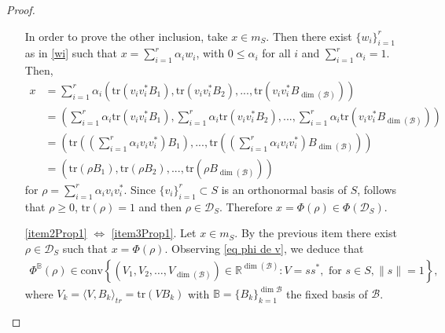 \documentclass[12pt,a4paper]{article}
\def\calB{\mathcal B}
\def\calD{\mathcal D}
\def\R{\mathbb R}
\def\tr{\text{tr}}
\numberwithin{equation}{section}
\begin{document}
\begin{proof}
\begin{enumerate}
	In order to prove the other inclusion, take $x\in m_S$. Then there exist  $\{w_i\}_{i=1}^{r}$ as in \eqref{wi} such that
	 $x=\sum_{i=1}^{r}\alpha_iw_i$, with $0\leq \alpha_i$ for all $i$ and $\sum_{i=1}^{r}\alpha_i=1$. Then, 
	 \begin{align*}
	 	x&= \sum_{i=1}^{r}\alpha_i\left( \tr(v_i v_i^* B_1),\tr(v_i v_i^* B_2),...,\tr(v_i v_i^* B_{\dim(\mathcal{B})})\right) \\
	 	&=  \left( \sum_{i=1}^{r}\alpha_i\tr(v_i v_i^* B_1),\sum_{i=1}^{r}\alpha_i\tr(v_i v_i^* B_2),...,\sum_{i=1}^{r}\alpha_i\tr(v_i v_i^* B_{\dim(\mathcal{B})})\right) \\
	 	&= \left(\tr\left( \left( \sum_{i=1}^{r}\alpha_iv_i v_i^*\right)  B_1\right) 
	 	,...,\tr\left( \left( \sum_{i=1}^{r}\alpha_iv_i v_i^*\right)  B_{\dim(\mathcal{B})}\right) \right) \\
	 	&= \left(\tr\left( \rho B_1\right) ,\tr\left(\rho  B_2\right) ,...,\tr\left( \rho B_{\dim(\mathcal{B})}\right) \right)
	 \end{align*}
	 for $\rho=\sum_{i=1}^{r}\alpha_iv_i v_i^*$.	 
	 Since $\{v_i\}_{i=1}^r\subset S$ is an orthonormal basis of $S$, follows that $\rho\geq 0$, 
	 $\tr(\rho)=1$ and then $\rho \in \mathcal{D}_S$. Therefore $x= \Phi(\rho)\in \Phi(\mathcal{D}_S)$.	 
	 
	\item[\ref{item2Prop1} $\Leftrightarrow$ \ref{item3Prop1}.] Let $x\in m_S$. By the previous item there exist  $\rho\in\calD_{S}$ such that $x=\Phi(\rho)$. Observing \eqref{eq phi de v}, we deduce that 
	\begin{equation*}
		\begin{split}
	\Phi^\mathbb{B}(\rho)\in \text{conv}  \left\{ (V_1,V_2,\dots,V_{\dim(\calB)})\in\R^{\dim(\calB)}:   
	V=s s^*, \text{ for }  
	s\in S,    
	  	    \|s\|=1  \right\}  ,		
		\end{split}
	\end{equation*}
	where $V_k=\langle V, B_k\rangle_{tr}=\tr(V B_k)$ with $\mathbb{B}=\{B_k\}_{k=1}^{\dim \calB}$ the fixed basis of $\calB$.
	

\end{enumerate}
\end{proof}
\end{document}
